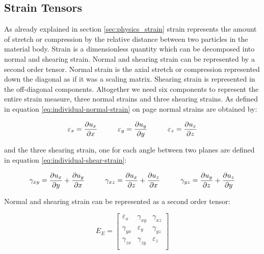 \subsection{Strain Tensors}
\label{sec:strain_tensors}
As already explained in section \vref{sec:physics_strain} strain
represents the amount of stretch or compression by the relative
distance between two particles in the material body. Strain is a
dimensionless quantity which can be decomposed into normal and
shearing strain. Normal and shearing strain can be represented by a
second order tensor.
Normal strain is the axial stretch or compression represented down the
diagonal as if it was a scaling matrix. Shearing strain is represented
in the off-diagonal components. Altogether we need six components to
represent the entire strain measure, three normal strains and three shearing
strains. As defined in equation \eqref{eq:individual-normal-strain} on
page \pageref{eq:individual-normal-strain} normal strains are obtained by:

\begin{equation*}
\varepsilon_x = \frac{\partial u_x}{\partial x} \hspace{10 mm}
\varepsilon_y = \frac{\partial u_y}{\partial y} \hspace{10 mm}
\varepsilon_z = \frac{\partial u_z}{\partial z}
\end{equation*}

and the three shearing strain, one for each angle between two planes
are defined in equation \eqref{eq:individual-shear-strain}:

\begin{equation*}
  \gamma_{xy} = \frac{\partial u_x}{\partial y} +
  \frac{\partial u_y}{\partial x} \hspace{10 mm}
  \gamma_{xz} = \frac{\partial u_x}{\partial z} +
  \frac{\partial u_z}{\partial x} \hspace{10 mm}
  \gamma_{yz} = \frac{\partial u_y}{\partial z} +
  \frac{\partial u_z}{\partial y}
\end{equation*}

Normal and shearing strain can be represented as a second order tensor:

\begin{equation} 
  E_E =
    \left[\begin{matrix} 
        \varepsilon_x & \gamma_{xy} & \gamma_{xz} \\ 
        \gamma_{yx} & \varepsilon_y & \gamma_{yz} \\ 
        \gamma_{zx} & \gamma_{zy} & \varepsilon_z \\ 
      \end{matrix}\right]
\end{equation}

